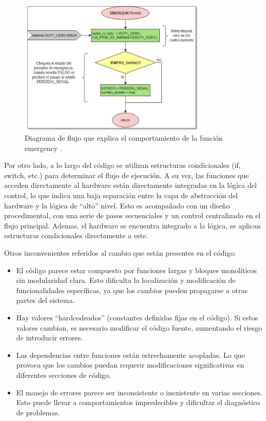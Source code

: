 \begin{figure}[h]
\caption{Diagrama de flujo que explica el comportamiento de la función emergency \cite[pág. 82]{disenioViejo1}.}
\label{diagra}
\begin{centering}
{\includegraphics[width=0.8\textwidth]{diagramaFlujo.png}\par}
\end{centering}
\end{figure}


Por otro lado, a lo largo del código se utilizan estructuras condicionales (if, switch, etc.) para determinar el flujo de ejecución. A su vez, las funciones que acceden directamente al hardware están directamente integradas en la lógica del control, lo que indica una baja separación entre la capa de abstracción del hardware y la lógica de ``alto'' nivel. Esto es acompañado con un diseño procedimental, con una serie de pasos secuenciales y un control centralizado en el flujo principal. Ademas, el hardware se encuentra integrado a la lógica, se aplican estructuras condicionales directamente a este.

Otros inconvenientes referidos al cambio que están presentes en el código:
\begin{itemize}
\item El código parece estar compuesto por funciones largas y bloques monolíticos sin modularidad clara. Esto dificulta la localización y modificación de funcionalidades específicas, ya que los cambios pueden propagarse a otras partes del sistema.
\item Hay valores ``hardcodeados'' (constantes definidas fijas en el código). Si estos valores cambian, es necesario modificar el código fuente, aumentando el riesgo de introducir errores.
\item Las dependencias entre funciones están estrechamente acopladas. Lo que provoca que los cambios puedan requerir modificaciones significativas en diferentes secciones de código.
\item El manejo de errores parece ser inconsistente o inexistente en varias secciones. Esto puede llevar a comportamientos impredecibles y dificultar el diagnóstico de problemas.
\end{itemize}

